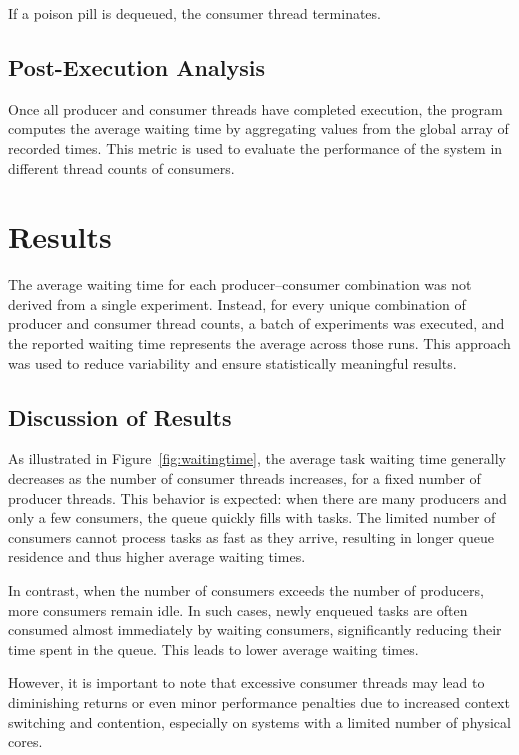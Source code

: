 \documentclass[11pt]{article}
\begin{document}
If a poison pill is dequeued, the consumer thread terminates.

\subsection{Post-Execution Analysis}

Once all producer and consumer threads have completed execution, the program computes the average waiting time by aggregating values from the global array of recorded times. This metric is used to evaluate the performance of the system in different thread counts of consumers.


\section{Results}

The average waiting time for each producer–consumer combination was not derived from a single experiment. Instead, for every unique combination of producer and consumer thread counts, a batch of experiments was executed, and the reported waiting time represents the average across those runs. This approach was used to reduce variability and ensure statistically meaningful results.

\subsection{Discussion of Results}

As illustrated in Figure~\ref{fig:waitingtime}, the average task waiting time generally decreases as the number of consumer threads increases, for a fixed number of producer threads. This behavior is expected: when there are many producers and only a few consumers, the queue quickly fills with tasks. The limited number of consumers cannot process tasks as fast as they arrive, resulting in longer queue residence and thus higher average waiting times.

In contrast, when the number of consumers exceeds the number of producers, more consumers remain idle. In such cases, newly enqueued tasks are often consumed almost immediately by waiting consumers, significantly reducing their time spent in the queue. This leads to lower average waiting times.

However, it is important to note that excessive consumer threads may lead to diminishing returns or even minor performance penalties due to increased context switching and contention, especially on systems with a limited number of physical cores.
\end{document}
